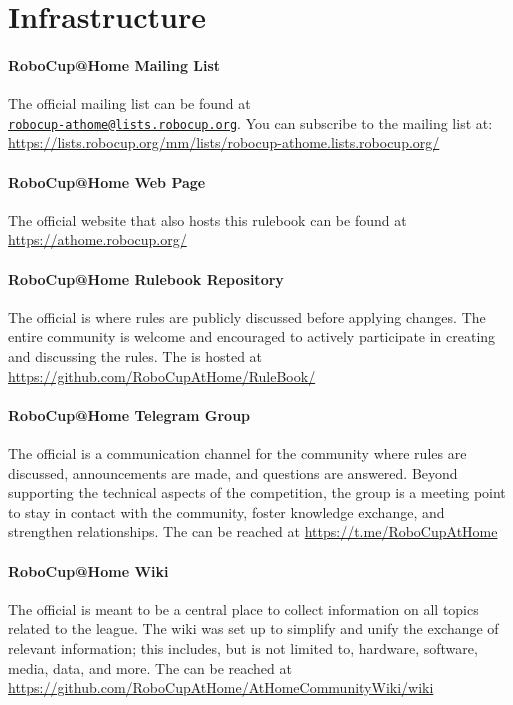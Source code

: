 \section{Infrastructure}
\label{sec:introduction:infrastructure}

\paragraph{RoboCup@Home Mailing List}
\label{sec:introduction:mailinglist}
The official \AtHome{} mailing list can be found at\\
\href{mailto:robocup-athome@lists.robocup.org}{\small\texttt{robocup-athome@lists.robocup.org}}.
You can subscribe to the mailing list at: {\small\url{https://lists.robocup.org/mm/lists/robocup-athome.lists.robocup.org/}}

\paragraph{RoboCup@Home Web Page}
\label{sec:introduction:webpage}
The official \AtHome{} website that also hosts this rulebook can be found at {\small\url{https://athome.robocup.org/}}

\paragraph{RoboCup@Home Rulebook Repository}
\label{sec:introduction:repo}
The official \AtHome{} \RR{} is where rules are publicly discussed before applying changes.
The entire \AtHome{} community is welcome and encouraged to actively participate in creating and discussing the rules.
The \RR{} is hosted at {\small\url{https://github.com/RoboCupAtHome/RuleBook/}}

\paragraph{RoboCup@Home Telegram Group}
\label{sec:introduction:telegramgroup}
The official \AtHome{} \TG{} is a communication channel for the \AtHome{} community where rules are discussed, announcements are made, and questions are answered.
Beyond supporting the technical aspects of the competition, the group is a meeting point to stay in contact with the community, foster knowledge exchange, and strengthen relationships.
The \TG{} can be reached at {\small\url{https://t.me/RoboCupAtHome}}

\paragraph{RoboCup@Home Wiki}
\label{sec:introduction:wiki}
The official \AtHome{} \WIKI{} is meant to be a central place to collect information on all topics related to the \AtHome{} league.
The wiki was set up to simplify and unify the exchange of relevant information; this includes, but is not limited to, hardware, software, media, data, and more.
The \WIKI{} can be reached at {\small\url{https://github.com/RoboCupAtHome/AtHomeCommunityWiki/wiki}}
